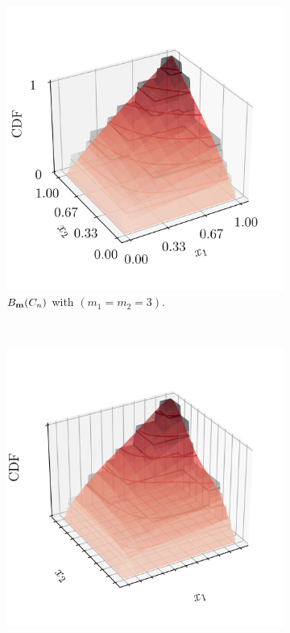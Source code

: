 \begin{figure}
\begin{subfigure}[b]{0.49\textwidth}
        \includegraphics[width=\linewidth]{../numerical_experiments/chapter3/figures/ebc_m3.png}
        \caption{$B_{{\bf m}}(C_n)$ with $(m_1=m_2=3)$.}
    \end{subfigure}
    \\
    \begin{subfigure}[b]{0.49\textwidth}
        \centering
        \includegraphics[width=\linewidth]{../numerical_experiments/chapter3/figures/ebc_m10.png}

\end{subfigure}
\end{figure}
